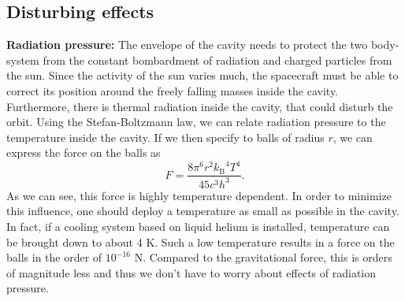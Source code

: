 \documentclass[prb,preprint]{revtex4-1}
\begin{document}
\subsection{Disturbing effects}

\textbf{Radiation pressure:} The envelope of the cavity needs to protect the two body-system from the constant bombardment of radiation and charged particles from the sun. Since the activity of the sun varies much, the spacecraft must be able to correct its position around the freely falling masses inside the cavity.\\
Furthermore, there is thermal radiation inside the cavity, that could disturb the orbit.
Using the Stefan-Boltzmann law, we can relate radiation pressure to the temperature inside the cavity. If we then specify to balls of radius $r$, we can express the force on the balls as 
\begin{equation}
F = \frac{8 \pi^6 r^2 {k_\mathrm{B}}^4 T^4}{45 c^3 h^3}.
\end{equation}
%
%
%
As we can see, this force is highly temperature dependent. In order to minimize this influence, one should deploy a temperature as small as possible in the cavity. In fact, if a cooling system based on liquid helium is installed, temperature can be brought down to about 4 K. Such a low temperature results in a force on the balls in the order of $10^{-16}$ N. Compared to the gravitational force, this is orders of magnitude less and thus we don't have to worry about effects of radiation pressure.\\
\end{document}
